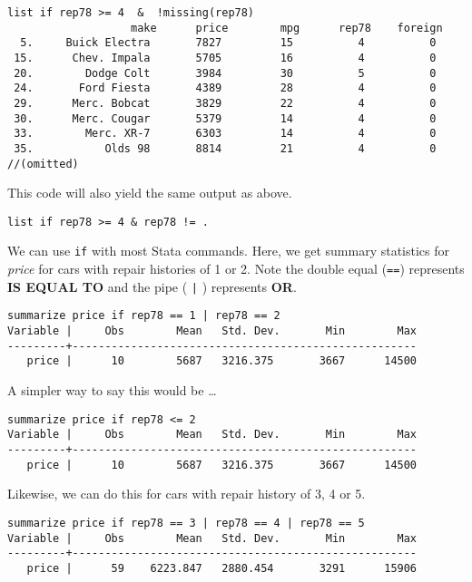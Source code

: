 \begin{lstlisting}
list if rep78 >= 4  &  !missing(rep78)
                   make      price        mpg      rep78    foreign
  5.     Buick Electra       7827         15          4          0
 15.      Chev. Impala       5705         16          4          0
 20.        Dodge Colt       3984         30          5          0
 24.       Ford Fiesta       4389         28          4          0
 29.      Merc. Bobcat       3829         22          4          0
 30.      Merc. Cougar       5379         14          4          0
 33.        Merc. XR-7       6303         14          4          0
 35.           Olds 98       8814         21          4          0
//(omitted)
\end{lstlisting}

This code will also yield the same output as above.

\begin{lstlisting}
list if rep78 >= 4 & rep78 != .
\end{lstlisting}

We can use \lstinline{if} with most Stata commands. Here, we get summary statistics for \textit{price} for cars with repair histories of 1 or 2. Note the double equal (\lstinline{==}) represents \textbf{IS EQUAL TO} and the pipe ( \lstinline{|} ) represents \textbf{OR}.

\begin{lstlisting}
summarize price if rep78 == 1 | rep78 == 2
Variable |     Obs        Mean   Std. Dev.       Min        Max
---------+-----------------------------------------------------
   price |      10        5687   3216.375       3667      14500
\end{lstlisting}

A simpler way to say this would be \ldots

\begin{lstlisting}
summarize price if rep78 <= 2
Variable |     Obs        Mean   Std. Dev.       Min        Max
---------+-----------------------------------------------------
   price |      10        5687   3216.375       3667      14500
\end{lstlisting}

Likewise, we can do this for cars with repair history of 3, 4 or 5.

\begin{lstlisting}
summarize price if rep78 == 3 | rep78 == 4 | rep78 == 5
Variable |     Obs        Mean   Std. Dev.       Min        Max
---------+-----------------------------------------------------
   price |      59    6223.847   2880.454       3291      15906
\end{lstlisting}

